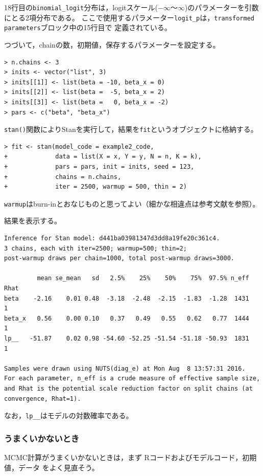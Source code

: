 \documentclass[11pt,uplatex]{jsarticle}
\begin{document}
18行目の\texttt{binomial\_logit}分布は，logitスケール($-\infty$〜$\infty$)のパラメーターを引数にとる2項分布である。
ここで使用するパラメーター\texttt{logit\_p}は，\texttt{transformed parameters}ブロック中の15行目で
定義されている。

つづいて，chainの数，初期値，保存するパラメーターを設定する。
\begin{lstlisting}
> n.chains <- 3
> inits <- vector("list", 3)
> inits[[1]] <- list(beta = -10, beta_x = 0)
> inits[[2]] <- list(beta =  -5, beta_x = 2)
> inits[[3]] <- list(beta =   0, beta_x = -2)
> pars <- c("beta", "beta_x")
\end{lstlisting}
\texttt{stan()}関数によりStanを実行して，結果を\texttt{fit}というオブジェクトに格納する。
\begin{lstlisting}
> fit <- stan(model_code = example2_code,
+             data = list(X = x, Y = y, N = n, K = k),
+             pars = pars, init = inits, seed = 123,
+             chains = n.chains,
+             iter = 2500, warmup = 500, thin = 2)
\end{lstlisting}
\noindent
\texttt{warmup}はburn-inとおなじものと思ってよい（細かな相違点は参考文献\cite{BDA3}を参照）。

結果を表示する。
\begin{lstlisting}[basicstyle=\ttfamily\footnotesize]
Inference for Stan model: d441ba03981347d3dd8a19fe20c361c4.
3 chains, each with iter=2500; warmup=500; thin=2; 
post-warmup draws per chain=1000, total post-warmup draws=3000.

         mean se_mean   sd   2.5%    25%    50%    75%  97.5% n_eff Rhat
beta    -2.16    0.01 0.48  -3.18  -2.48  -2.15  -1.83  -1.28  1431    1
beta_x   0.56    0.00 0.10   0.37   0.49   0.55   0.62   0.77  1444    1
lp__   -51.87    0.02 0.98 -54.60 -52.25 -51.54 -51.18 -50.93  1831    1

Samples were drawn using NUTS(diag_e) at Mon Aug  8 13:57:31 2016.
For each parameter, n_eff is a crude measure of effective sample size,
and Rhat is the potential scale reduction factor on split chains (at 
convergence, Rhat=1).
\end{lstlisting}
\noindent
なお，\texttt{lp\_\_}はモデルの対数確率である。

\subsubsection{うまくいかないとき}
MCMC計算がうまくいかないときは，まず \textsf{R}コードおよびモデルコード，初期値，データ
をよく見直そう。
\end{document}
